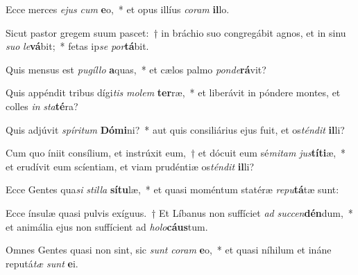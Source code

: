 \item Ecce merces \textit{e}\textit{jus} \textit{cum} \textbf{e}o,~* et opus illíus \textit{co}\textit{ram} \textbf{il}lo.
\item Sicut pastor gregem suum pascet:~† in bráchio suo congregábit agnos, et in sinu \textit{su}\textit{o} \textit{le}\textbf{vá}bit;~* fetas ip\textit{se} \textit{por}\textbf{tá}bit.
\item Quis mensus est \textit{pu}\textit{gíl}\textit{lo} \textbf{a}quas,~* et cælos palmo \textit{pon}\textit{de}\textbf{rá}vit?
\item Quis appéndit tribus dígi\textit{tis} \textit{mo}\textit{lem} \textbf{ter}ræ,~* et liberávit in póndere montes, et colles \textit{in} \textit{sta}\textbf{té}ra?
\item Quis adjúvit \textit{spí}\textit{ri}\textit{tum} \textbf{Dó}\textbf{mi}ni?~* aut quis consiliárius ejus fuit, et os\textit{tén}\textit{dit} \textbf{il}li?
\item Cum quo íniit consílium, et instrúxit eum,~† et dócuit eum sé\textit{mi}\textit{tam} \textit{jus}\textbf{tí}\textbf{ti}æ,~* et erudívit eum scíentiam, et viam prudéntiæ os\textit{tén}\textit{dit} \textbf{il}li?
\item Ecce Gentes qua\textit{si} \textit{stil}\textit{la} \textbf{sí}\textbf{tu}læ,~* et quasi moméntum statéræ \textit{re}\textit{pu}\textbf{tá}tæ sunt:
\item Ecce ínsulæ quasi pulvis exíguus.~† Et Líbanus non suffíciet \textit{ad} \textit{suc}\textit{cen}\textbf{dén}dum,~* et animália ejus non suffícient ad \textit{ho}\textit{lo}\textbf{cáus}tum.
\item Omnes Gentes quasi non sint, sic \textit{sunt} \textit{co}\textit{ram} \textbf{e}o,~* et quasi níhilum et ináne reputá\textit{tæ} \textit{sunt} \textbf{e}i.
